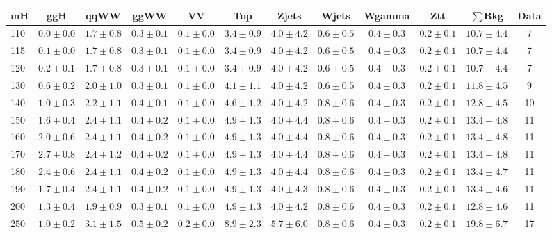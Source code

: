 \begin{table}
{%
 \tiny
 \begin{center}
 \begin{tabular}{l c c c c c c c c c c c }
 \hline
 mH & ggH & qqWW & ggWW & VV & Top & Zjets & Wjets & Wgamma & Ztt & $\sum$Bkg & Data \\
 \hline
110 & $0.0\pm0.0$ & $1.7\pm0.8$ & $0.3\pm0.1$ & $0.1\pm0.0$ & $3.4\pm0.9$ & $4.0\pm4.2$ & $0.6\pm0.5$ & $0.4\pm0.3$ & $0.2\pm0.1$ & $10.7\pm4.4$ & 7 \\
115 & $0.1\pm0.0$ & $1.7\pm0.8$ & $0.3\pm0.1$ & $0.1\pm0.0$ & $3.4\pm0.9$ & $4.0\pm4.2$ & $0.6\pm0.5$ & $0.4\pm0.3$ & $0.2\pm0.1$ & $10.7\pm4.4$ & 7 \\
120 & $0.2\pm0.1$ & $1.7\pm0.8$ & $0.3\pm0.1$ & $0.1\pm0.0$ & $3.4\pm0.9$ & $4.0\pm4.2$ & $0.6\pm0.5$ & $0.4\pm0.3$ & $0.2\pm0.1$ & $10.7\pm4.4$ & 7 \\
130 & $0.6\pm0.2$ & $2.0\pm1.0$ & $0.3\pm0.1$ & $0.1\pm0.0$ & $4.1\pm1.1$ & $4.0\pm4.2$ & $0.6\pm0.5$ & $0.4\pm0.3$ & $0.2\pm0.1$ & $11.8\pm4.5$ & 9 \\
140 & $1.0\pm0.3$ & $2.2\pm1.1$ & $0.4\pm0.1$ & $0.1\pm0.0$ & $4.6\pm1.2$ & $4.0\pm4.2$ & $0.8\pm0.6$ & $0.4\pm0.3$ & $0.2\pm0.1$ & $12.8\pm4.5$ & 10 \\
150 & $1.6\pm0.4$ & $2.4\pm1.1$ & $0.4\pm0.2$ & $0.1\pm0.0$ & $4.9\pm1.3$ & $4.0\pm4.4$ & $0.8\pm0.6$ & $0.4\pm0.3$ & $0.2\pm0.1$ & $13.4\pm4.8$ & 11 \\
160 & $2.0\pm0.6$ & $2.4\pm1.1$ & $0.4\pm0.2$ & $0.1\pm0.0$ & $4.9\pm1.3$ & $4.0\pm4.4$ & $0.8\pm0.6$ & $0.4\pm0.3$ & $0.2\pm0.1$ & $13.4\pm4.8$ & 11 \\
170 & $2.7\pm0.8$ & $2.4\pm1.2$ & $0.4\pm0.2$ & $0.1\pm0.0$ & $4.9\pm1.3$ & $4.0\pm4.4$ & $0.8\pm0.6$ & $0.4\pm0.3$ & $0.2\pm0.1$ & $13.4\pm4.8$ & 11 \\
180 & $2.4\pm0.6$ & $2.4\pm1.1$ & $0.4\pm0.2$ & $0.1\pm0.0$ & $4.9\pm1.3$ & $4.0\pm4.4$ & $0.8\pm0.6$ & $0.4\pm0.3$ & $0.2\pm0.1$ & $13.4\pm4.7$ & 11 \\
190 & $1.7\pm0.4$ & $2.4\pm1.1$ & $0.4\pm0.2$ & $0.1\pm0.0$ & $4.9\pm1.3$ & $4.0\pm4.3$ & $0.8\pm0.6$ & $0.4\pm0.3$ & $0.2\pm0.1$ & $13.4\pm4.6$ & 11 \\
200 & $1.3\pm0.4$ & $1.9\pm0.9$ & $0.3\pm0.1$ & $0.1\pm0.0$ & $4.9\pm1.3$ & $4.0\pm4.2$ & $0.8\pm0.6$ & $0.4\pm0.3$ & $0.2\pm0.1$ & $12.8\pm4.6$ & 11 \\
250 & $1.0\pm0.2$ & $3.1\pm1.5$ & $0.5\pm0.2$ & $0.2\pm0.0$ & $8.9\pm2.3$ & $5.7\pm6.0$ & $0.8\pm0.6$ & $0.4\pm0.3$ & $0.2\pm0.1$ & $19.8\pm6.7$ & 17 \\

\end{tabular}
\end{center}}
\end{table}
